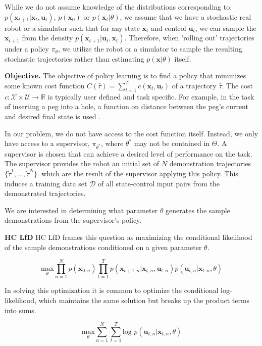 \documentclass[10pt, conference]{ieeeconf}      %
\newcommand{\bu}{\mathbf{u}}
\newcommand{\bx}{\mathbf{x}}
\newcommand{\ns}{HC LfD }
\begin{document}
While we do not assume knowledge of the distributions corresponding to: $p(\bx_{t+1}|\bx_t,\bu_t)$, $p(\bx_0)$ or $p(\bx_t|
\theta)$, we assume that we have a stochastic real robot or a simulator such that for any state
$\bx_t$ and control $\bu_t$, we can sample the $\bx_{t+1}$ from the density $p(\bx_{t+1}|\bu_t,\bx_t)$. 
Therefore, when 'rolling out' trajectories under a policy
$\pi_{\theta}$, we utilize the robot or a simulator to sample the resulting stochastic trajectories rather than
estimating $p(\bx|\theta)$ itself.


\noindent\textbf{Objective.} The objective of policy learning is to find a policy that minimizes some known cost function $C(\hat{\tau}) = \sum^T_{t=1} c(\bx_t,\bu_t)$ of a trajectory $\hat{\tau}$. The cost $c:\mathcal{X}\times \mathcal{U}\to \mathbb{R}$ is typically user defined and task specific. 
For example, in the task of inserting a peg into a hole, a function on distance between the peg's current and desired final state is used \cite{levine2015end}.  


In our problem, we do not have access to the cost function itself. Instead, we only have access to 
a supervisor, $\pi_{\theta^*}$, where $\theta^*$ may not be contained in $\Theta$. A supervisor is chosen that can achieve a desired level of performance on the task. The supervisor provides the robot an initial set
of $N$   demonstration trajectories $\lbrace \tilde{\tau}^1,...,\tilde{\tau}^N \rbrace$. 
which are the result of the supervisor applying this policy. This induces a training data set $\mathcal{D}$ of all state-control input pairs from the demonstrated trajectories.

We are interested in determining what parameter $\theta$ generates the sample demonstrations from the supervisor's policy. 

\noindent \textbf{\ns} \ns frames this  question as maximizing the conditional likelihood of the sample demonstrations conditioned on a given parameter $\theta$. 

$$\underset{\theta}{\mbox{max}} \prod^N_{n=1} p(\bx_{0,n}) \prod^T_{t=1} p(\bx_{t+1,n}|\bx_{t,n},\bu_{t,n})p(\bu_{t,n}|\bx_{t,n},\theta)$$

In solving this optimization it is common to optimize the conditional log-likelihood, which maintains the same solution but breaks up the product terms into sums. 

\begin{equation}\label{eq:m_likeli_obj}
\underset{\theta}{\mbox{max}} \sum^N_{n=1}\sum^T_{t=1}\mbox{log }p(\bu_{t,n}|\bx_{t,n},\theta)
\end{equation}
\end{document}
